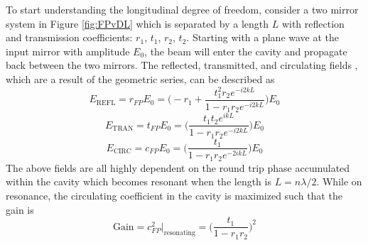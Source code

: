 		To start understanding the longitudinal degree of freedom, consider a two mirror system in Figure \ref{fig:FPvDL} which is separated by a length $L$ with reflection and transmission coefficients: $r_1$, $t_1$, $r_2$, $t_2$.  Starting with a plane wave at the input mirror with amplitude $E_0$, the beam will enter the cavity and propagate back between the two mirrors.  The reflected, transmitted, and circulating fields \cite{Saulson}, which are a result of the geometric series, can be described as
		\begin{equation}\label{r_FP}
		E_{\text{REFL}} = r_{FP} E_0 = \bigg(-r_1 + \frac{t_1^2 r_2  e^{-i2kL}}{1-r_1 r_2 e^{-i2kL}} \bigg) E_0
		\end{equation}
		\begin{equation}\label{t_FP}
		E_{\text{TRAN}} = t_{FP} E_{0} = \bigg( \frac{t_1 t_2 e^{ikL}}{1-r_1 r_2 e^{-i2kL}}\bigg) E_0
		\end{equation}
		\begin{equation}\label{c_FP}
		E_{\text{CIRC}} = c_{FP} E_0 = \bigg(\frac{t_1}{1- r_1 r_2 e^{-2ikL}} \bigg) E_0
		\end{equation}
		The above fields are all highly dependent on the round trip phase accumulated within the cavity which becomes resonant when the length is $L = n \lambda / 2$. While on resonance, the circulating coefficient in the cavity is maximized such that the gain is
		\begin{equation}
		\text{Gain} = c^2_{FP} \vert_{\text{resonating}} = \bigg( \frac{t_1}{1-r_1 r_2}\bigg)^2
		\end{equation}

